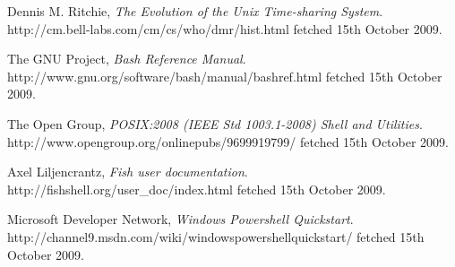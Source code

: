 \documentclass[12pt]{article}
\begin{document}
\begin{thebibliography}{9} %

  Dennis M. Ritchie,
  \emph{The Evolution of the Unix Time-sharing System}.
  http://cm.bell-labs.com/cm/cs/who/dmr/hist.html fetched 15th October
  2009.

  The GNU Project,
  \emph{Bash Reference Manual}.
  http://www.gnu.org/software/bash/manual/bashref.html fetched 15th
  October 2009.
 
  The Open Group,
  \emph{POSIX:2008 (IEEE Std 1003.1-2008) Shell and Utilities}.
  http://www.opengroup.org/onlinepubs/9699919799/ fetched 15th October
  2009.

  Axel Liljencrantz,
  \emph{Fish user documentation}.
  http://fishshell.org/user\_doc/index.html fetched 15th October 2009.

  Microsoft Developer Network,
  \emph{Windows Powershell Quickstart}.
  http://channel9.msdn.com/wiki/windowspowershellquickstart/ fetched
  15th October 2009.

\end{thebibliography}
\end{document}
